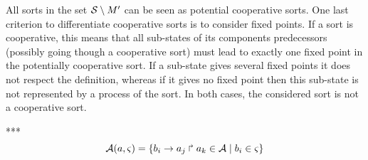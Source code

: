 All sorts in the set $\mathcal{S} \setminus M'$ can be seen as potential cooperative sorts. One last criterion to differentiate cooperative sorts is to consider fixed points. If a sort is cooperative, this means that all sub-states of its components predecessors (possibly going though a cooperative sort) must lead to exactly one fixed point in the potentially cooperative sort. If a sub-state gives several fixed points it does not respect the definition, whereas if it gives no fixed point then this sub-state is not represented by a process of the sort. In both cases, the considered sort is not a cooperative sort.

***
\begin{equation}
\PHa(a, \varsigma) = \{ \PHfrappe{b_i}{a_j}{a_k} \in \PHa \mid 
	b_i \in \varsigma \} %
\label{eq:Actx}
\end{equation}

